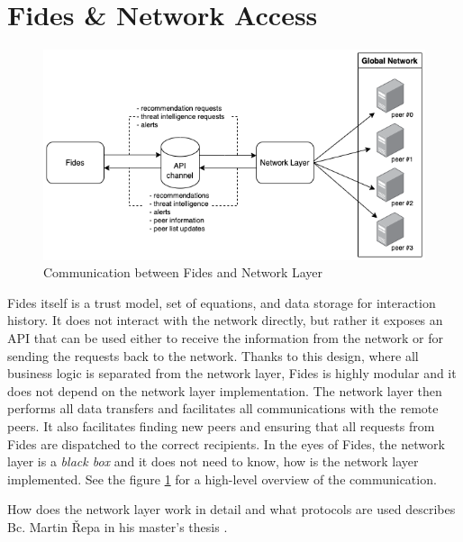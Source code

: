 \section{Fides \& Network Access}
\label{sec:fides-and-network-access}

\begin{figure}[ht]
    \centering
    \includegraphics[width=1.0\textwidth]{assets/tl_api_nl.png}
    \caption{Communication between Fides and Network Layer}
    \label{fig:fides-api-network}
\end{figure}

Fides itself is a trust model, set of equations, and data storage for interaction history. 
It does not interact with the network directly, but rather it exposes an API that can be used either to receive the information from the network or for sending the requests back to the network.
Thanks to this design, where all business logic is separated from the network layer, Fides is highly modular and it does not depend on the network layer implementation.
The network layer then performs all data transfers and facilitates all communications with the remote peers.
It also facilitates finding new peers and ensuring that all requests from Fides are dispatched to the correct recipients.
In the eyes of Fides, the network layer is a \textit{black box} and it does not need to know, how is the network layer implemented.
See the figure \ref{fig:fides-api-network} for a high-level overview of the communication.

How does the network layer work in detail and what protocols are used describes Bc. Martin Řepa in his master's thesis \cite{nl}.